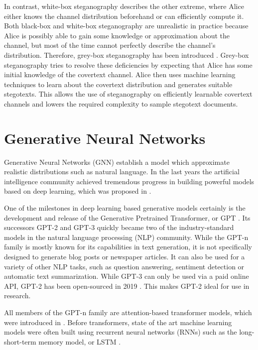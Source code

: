 In contrast, white-box steganography describes the other extreme, where Alice either knows the channel distribution beforehand or can efficiently compute it.
Both black-box and white-box steganography are unrealistic in practice because Alice is possibly able to gain some knowledge or approximation about the channel, but most of the time cannot perfectly describe the channel's distribution.
Therefore, grey-box steganography has been introduced \cite{LRW2013}.
Grey-box steganography tries to resolve these deficiencies by expecting that Alice has some initial knowledge of the covertext channel.
Alice then uses machine learning techniques to learn about the covertext distribution and generates suitable stegotexts.
This allows the use of steganography on efficiently learnable covertext channels and lowers the required complexity to sample stegotext documents.

\section{Generative Neural Networks}
\label{sec:generative-neural-networks}

Generative Neural Networks (GNN) establish a model which approximate realistic distributions such as natural language.
In the last years the artificial intelligence community achieved tremendous progress in building powerful models based on deep learning, which was proposed in \cite{DeepLearning2015}.

One of the milestones in deep learning based generative models certainly is the development and release of the Generative Pretrained Transformer, or GPT \cite{OpenAI2018}.
Its successors GPT-2 \cite{OpenAI2019} and GPT-3 \cite{OpenAI2020} quickly became two of the industry-standard models in the natural language processing (NLP) community.
While the GPT-n family is mostly known for its capabilities in text generation, it is not specifically designed to generate blog posts or newspaper articles.
It can also be used for a variety of other NLP tasks, such as question answering, sentiment detection or automatic text summarization.
While GPT-3 can only be used via a paid online API, GPT-2 has been open-sourced in 2019 \cite{GPTReleasePlan2019}.
This makes GPT-2 ideal for use in research.

All members of the GPT-n family are attention-based transformer models, which were introduced in \cite{Vaswani2017}.
Before transformers, state of the art machine learning models were often built using recurrent neural networks (RNNs) such as the long-short-term memory model, or LSTM \cite{Hochreiter1997}.

